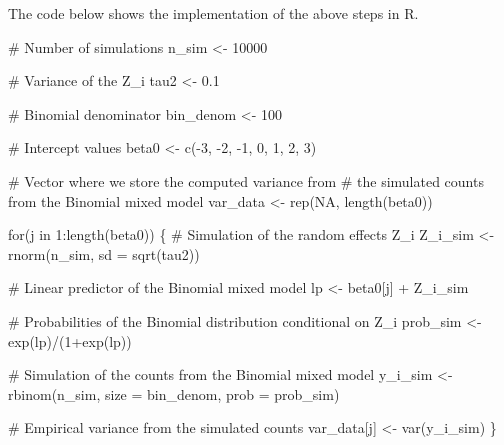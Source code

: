 \documentclass[
  letterpaper,
]{krantz}
\newenvironment{Shaded}{\begin{snugshade}}{\end{snugshade}}
\newcommand{\AttributeTok}[1]{\textcolor[rgb]{0.40,0.45,0.13}{#1}}
\newcommand{\CommentTok}[1]{\textcolor[rgb]{0.37,0.37,0.37}{#1}}
\newcommand{\ConstantTok}[1]{\textcolor[rgb]{0.56,0.35,0.01}{#1}}
\newcommand{\ControlFlowTok}[1]{\textcolor[rgb]{0.00,0.23,0.31}{#1}}
\newcommand{\DecValTok}[1]{\textcolor[rgb]{0.68,0.00,0.00}{#1}}
\newcommand{\FloatTok}[1]{\textcolor[rgb]{0.68,0.00,0.00}{#1}}
\newcommand{\FunctionTok}[1]{\textcolor[rgb]{0.28,0.35,0.67}{#1}}
\newcommand{\NormalTok}[1]{\textcolor[rgb]{0.00,0.23,0.31}{#1}}
\newcommand{\OtherTok}[1]{\textcolor[rgb]{0.00,0.23,0.31}{#1}}
\newcommand{\SpecialCharTok}[1]{\textcolor[rgb]{0.37,0.37,0.37}{#1}}
\begin{document}
The code below shows the implementation of the above steps in R.

\begin{Shaded}
\begin{Highlighting}[]
\CommentTok{\# Number of simulations}
\NormalTok{n\_sim }\OtherTok{\textless{}{-}} \DecValTok{10000}

\CommentTok{\# Variance of the Z\_i}
\NormalTok{tau2 }\OtherTok{\textless{}{-}} \FloatTok{0.1}

\CommentTok{\# Binomial denominator }
\NormalTok{bin\_denom }\OtherTok{\textless{}{-}} \DecValTok{100}

\CommentTok{\# Intercept values}
\NormalTok{beta0 }\OtherTok{\textless{}{-}} \FunctionTok{c}\NormalTok{(}\SpecialCharTok{{-}}\DecValTok{3}\NormalTok{, }\SpecialCharTok{{-}}\DecValTok{2}\NormalTok{, }\SpecialCharTok{{-}}\DecValTok{1}\NormalTok{, }\DecValTok{0}\NormalTok{, }\DecValTok{1}\NormalTok{, }\DecValTok{2}\NormalTok{, }\DecValTok{3}\NormalTok{)}

\CommentTok{\# Vector where we store the computed variance from}
\CommentTok{\# the simulated counts from the Binomial mixed model}
\NormalTok{var\_data }\OtherTok{\textless{}{-}} \FunctionTok{rep}\NormalTok{(}\ConstantTok{NA}\NormalTok{, }\FunctionTok{length}\NormalTok{(beta0))}


\ControlFlowTok{for}\NormalTok{(j }\ControlFlowTok{in} \DecValTok{1}\SpecialCharTok{:}\FunctionTok{length}\NormalTok{(beta0)) \{}
  \CommentTok{\# Simulation of the random effects Z\_i}
\NormalTok{  Z\_i\_sim }\OtherTok{\textless{}{-}} \FunctionTok{rnorm}\NormalTok{(n\_sim, }\AttributeTok{sd =} \FunctionTok{sqrt}\NormalTok{(tau2))}

  \CommentTok{\# Linear predictor of the Binomial mixed model}
\NormalTok{  lp }\OtherTok{\textless{}{-}}\NormalTok{ beta0[j]  }\SpecialCharTok{+}\NormalTok{ Z\_i\_sim}
  
  \CommentTok{\# Probabilities of the Binomial distribution conditional on Z\_i}
\NormalTok{  prob\_sim }\OtherTok{\textless{}{-}} \FunctionTok{exp}\NormalTok{(lp)}\SpecialCharTok{/}\NormalTok{(}\DecValTok{1}\SpecialCharTok{+}\FunctionTok{exp}\NormalTok{(lp))}
  
  \CommentTok{\# Simulation of the counts from the Binomial mixed model}
\NormalTok{  y\_i\_sim }\OtherTok{\textless{}{-}} \FunctionTok{rbinom}\NormalTok{(n\_sim, }\AttributeTok{size =}\NormalTok{ bin\_denom, }\AttributeTok{prob =}\NormalTok{ prob\_sim)}
  
  \CommentTok{\# Empirical variance from the simulated counts}
\NormalTok{  var\_data[j] }\OtherTok{\textless{}{-}} \FunctionTok{var}\NormalTok{(y\_i\_sim)}
\NormalTok{\}}


\end{Highlighting}
\end{Shaded}
\end{document}
